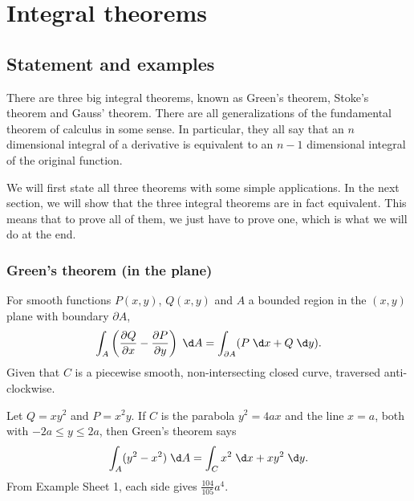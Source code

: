 \documentclass[a4paper]{article}
\begin{document}
\section{Integral theorems}
\subsection{Statement and examples}
There are three big integral theorems, known as Green's theorem, Stoke's theorem and Gauss' theorem. There are all generalizations of the fundamental theorem of calculus in some sense. In particular, they all say that an $n$ dimensional integral of a derivative is equivalent to an $n - 1$ dimensional integral of the original function.

We will first state all three theorems with some simple applications. In the next section, we will show that the three integral theorems are in fact equivalent. This means that to prove all of them, we just have to prove one, which is what we will do at the end.

\subsubsection{Green's theorem (in the plane)}
\begin{thm}
  For smooth functions $P(x, y)$, $Q(x, y)$ and $A$ a bounded region in the $(x, y)$ plane with boundary $\partial A$,
  \[
    \int_A \left(\frac{\partial Q}{\partial x} - \frac{\partial P}{\partial y}\right)\;\d A = \int_{\partial A}(P\;\d x + Q\;\d y).
  \]
  Given that $C$ is a piecewise smooth, non-intersecting closed curve, traversed anti-clockwise.
\end{thm}

\begin{eg}
  Let $Q = xy^2$ and $P = x^2y$. If $C$ is the parabola $y^2 = 4ax$ and the line $x = a$, both with $-2a \leq y \leq 2a$, then Green's theorem says
  \[
    \int_A (y^2 - x^2)\;\d A = \int_C x^2 \;\d x + xy^2\;\d y.
  \]
  From Example Sheet 1, each side gives $\frac{104}{105} a^4$.
\end{eg}
\end{document}
